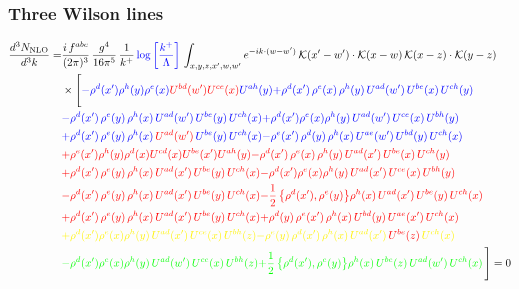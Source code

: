 \documentclass[9pt]{article}
\numberwithin{equation}{section}
\begin{document}
\subsubsection{Three Wilson lines}
\begin{align}
\frac{d^{3}N_{\rm NLO}}{d^{3}k}= &\frac{i\,f^{abc}}{(2\pi)^{3}}\,\frac{g^{4}}{16\pi^{5}}\,\frac{1}{k^{+}}\,{\color{blue}\log{\left[\frac{k^{+}}{\Lambda}\right]}}\,\int_{x,y,z,x',w,w'}e^{-ik\cdot (w-w')}\,\mathcal{K}(x'-w')\cdot\mathcal{K}(x-w)\,\mathcal{K}(x-z)\cdot\mathcal{K}(y-z)\notag\\
&\times\Bigg[{\color{blue}-\rho^{d}(x') \rho^{h}(y) \rho^{e}(x) {\color{red}U^{bd}(w')} {\color{red}U^{ce}(x)} U^{a h}(y)} {\color{blue}+\rho^{d}(x')\,\rho^{e}(x)\,\rho^{h}(y)\,U^{ad}(w')\,U^{be}(x)\,U^{ch}(y)} \notag \\ &{\color{blue}-\rho^{d}(x')\,\rho^{e}(y)\,\rho^{h}(x)\,U^{ad}(w')\,U^{be}(y)\,U^{ch}(x)}{\color{blue}+\rho^{d}(x')\rho^{e}(x)\rho^{h}(y)\, U^{ad}(w')\,U^{ce}(x)\, U^{bh}(y)}\notag \\ &{\color{blue}+\rho^{d}(x')\, \rho^{e}(y)\,\rho^{h}(x)\, {\color{red}U^{ad}(w')}\,U^{be}(y)\,U^{ch}(x)}{\color{blue}-\rho^{e}(x')\,\rho^{d}(y)\,\rho^{h}(x)\,U^{ae}(w')\,U^{bd}(y)\,U^{ch}(x)}\notag \\ &{\color{red}+\rho^{e}(x') \rho^{h}(y) \rho^{d}(x) {\color{red}U^{cd}(x)} U^{b e}(x') U^{a h}(y)}{\color{red}-\rho^{d}(x')\,\rho^{e}(x)\,\rho^{h}(y)\,U^{ad}(x')\,U^{be}(x)\,U^{ch}(y)}\notag \\ &{\color{red}+\rho^{d}(x')\,\rho^{e}(y)\,\rho^{h}(x)\,U^{ad}(x')\,U^{be}(y)\,U^{ch}(x)}{\color{red}-\rho^{d}(x')\rho^{e}(x)\rho^{h}(y)\, U^{ad}(x')\,U^{ce}(x)\, U^{bh}(y)}\notag \\ &{\color{red}-\rho^{d}(x')\, \rho^{e}(y)\,\rho^{h}(x)\, {\color{red}U^{ad}(x')}\,U^{be}(y)\,U^{ch}(x)}{\color{red}-\frac{1}{2}\,\big\{\rho^{d}(x'),\rho^{e}(y)\big\}\rho^{h}(x)\,U^{ad}(x')\,U^{be}(y)\,U^{ch}(x)}\notag \\ & {\color{red}+\rho^{d}(x')\,\rho^{e}(y)\,\rho^{h}(x)\,U^{ad}(x')\,U^{be}(y)\,U^{ch}(x)}{\color{red}+\rho^{d}(y)\,\rho^{e}(x')\,\rho^{h}(x)\,U^{bd}(y)\,U^{ae}(x')\,U^{ch}(x)}\notag \\ & {\color{yellow}+\rho^{d}(x')\rho^{e}(x)\rho^{h}(y)\, U^{ad}(x')\,U^{ce}(x)\, U^{bh}(z)}{\color{yellow}-\rho^{e}(y)\,\rho^{d}(x')\,\rho^{h}(x)\,U^{ad}(x')\,{\color{red}U^{be}(z)}\,U^{ch}(x)}\notag \\
&{\color{green}-\rho^{d}(x')\rho^{e}(x)\rho^{h}(y)\, U^{ad}(w')\,U^{ce}(x)\, U^{bh}(z)}{\color{green}+\frac{1}{2}\,\big\{\rho^{d}(x'),\rho^{e}(y)\big\}\rho^{h}(x)\,U ^{be}(z)\,U^{ad}(w')\,U^{ch}(x)}\,\Bigg] = 0 
\end{align}
\end{document}
